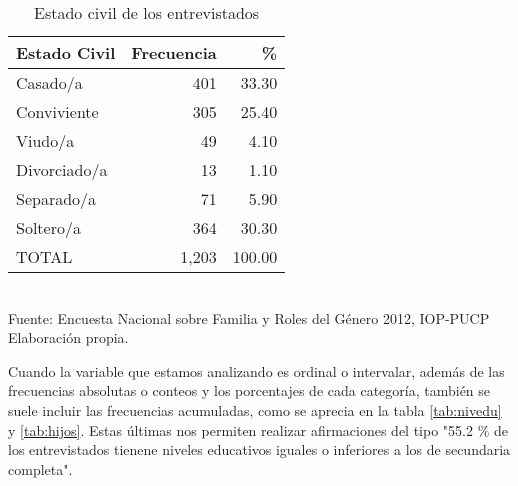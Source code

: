 \documentclass{article}
\begin{document}
\begin{table}[htbp]
\caption{Estado civil de los entrevistados}
\label{tab:ecivil}
\begin{center}
\begin{tabular}{lrr}
  \hline
Estado Civil & Frecuencia & \% \\ 
  \hline
Casado/a & 401 & 33.30 \\ 
  Conviviente & 305 & 25.40 \\ 
  Viudo/a &  49 & 4.10 \\ 
  Divorciado/a &  13 & 1.10 \\ 
  Separado/a &  71 & 5.90 \\ 
  Soltero/a & 364 & 30.30 \\ 
   \hline
   TOTAL & 1,203 & 100.00\\
   \hline
\end{tabular}
\\Fuente: Encuesta Nacional sobre Familia y Roles del Género 2012, IOP-PUCP\\
Elaboración propia.
\end{center}
\end{table}

Cuando la variable que estamos analizando es ordinal o intervalar, además de las frecuencias absolutas o conteos y los porcentajes de cada categoría, también se suele incluir las frecuencias acumuladas, como se aprecia en la tabla \ref{tab:nivedu} y \ref{tab:hijos}. Estas últimas nos permiten realizar afirmaciones del tipo "55.2 \% de los entrevistados tienene niveles educativos iguales o inferiores a los de secundaria completa". 
\end{document}

